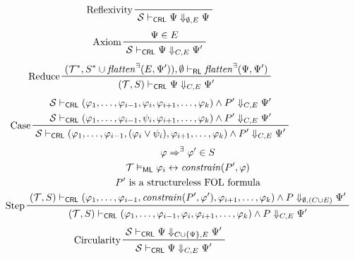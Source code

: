 \documentclass{article}
\newcommand{\RL}{\mathsf{RL}}
\newcommand{\ML}{\mathsf{ML}}
\newcommand{\CRL}{\mathsf{CRL}}
\begin{document}
\begin{figure}
    \centering
    \begin{align*}
    & \prftree[l]{Reflexivity}{\mathcal{S} \vdash_\CRL \Psi \Downarrow_{\emptyset,E} \Psi}
    \end{align*}
    \begin{align*}
    & \prftree[l]{Axiom}{\Psi \in E}{\mathcal{S} \vdash_\CRL \Psi \Downarrow_{C,E} \Psi^\prime}
    \end{align*}
    \begin{align*}
    & \prftree[l]{Reduce}
      {(\mathcal{T}^*, S^* \cup \mathit{flatten}^\exists(E, \Psi^\prime)), \emptyset \vdash_\RL
        \mathit{flatten}^\exists(\Psi, \Psi^\prime) }
      {(\mathcal{T}, S) \vdash_\CRL \Psi \Downarrow_{C,E} \Psi^\prime}
    \end{align*}
    \begin{align*}
    & \prftree[l]{Case}
    { \prfStackPremises
      {\mathcal{S} \vdash_\CRL (\varphi_1, \ldots, \varphi_{i-1}, \varphi_i, \varphi_{i+1}, \ldots, \varphi_k) \land P^\prime \Downarrow_{C, E} \Psi^\prime }
      {\mathcal{S} \vdash_\CRL (\varphi_1, \ldots, \varphi_{i-1}, \psi_i, \varphi_{i+1}, \ldots, \varphi_k) \land P^\prime \Downarrow_{C, E} \Psi^\prime }
    }
    {\mathcal{S} \vdash_\CRL (\varphi_1, \ldots, \varphi_{i-1}, (\varphi_i \lor \psi_i), \varphi_{i+1}, \ldots, \varphi_k) \land P^\prime \Downarrow_{C, E} \Psi^\prime}
    \end{align*}
    \begin{align*}
    & \prftree[l]{Step}
    { \prfStackPremises
       {\varphi \Rightarrow^\exists \varphi^\prime \in S}
       {\mathcal{T} \vDash_\ML \varphi_i \leftrightarrow \mathit{constrain}(P^\prime, \varphi)}
       {P^\prime \mbox{ is a structureless FOL formula}}
       {  (\mathcal{T}, S) \vdash_\CRL (\varphi_1, \ldots, \varphi_{i-1}, \mathit{constrain}(P^\prime, \varphi^\prime), \varphi_{i+1}, \ldots, \varphi_k)
          \land P
          \Downarrow_{\emptyset, (C \cup E)} \Psi^\prime
      }
    }
    {(\mathcal{T}, S) \vdash_\CRL (\varphi_1, \ldots, \varphi_{i-1}, \varphi_i, \varphi_{i+1}, \ldots, \varphi_k) \land P \Downarrow_{C, E} \Psi^\prime}
    \end{align*}
    \begin{align*}
    & \prftree[l]{Circularity}
      { \mathcal{S} \vdash_\CRL \Psi \Downarrow_{C \cup \{ \Psi \} , E} \Psi^\prime}
      { \mathcal{S} \vdash_\CRL \Psi \Downarrow_{C, E} \Psi^\prime}
    \end{align*}
    \begin{align*}

\end{align*}
\end{figure}
\end{document}
